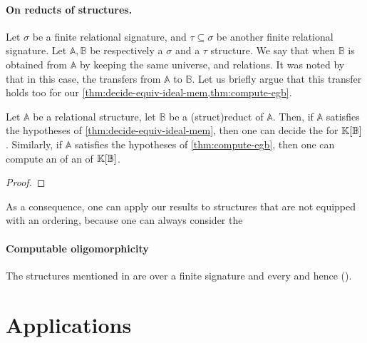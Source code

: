 \paragraph{On reducts of structures.} \AP Let $\sigma$ be a finite relational
signature, and $\tau \subseteq \sigma$ be another finite relational signature.
Let $\mathbb{A}, \mathbb{B}$ be respectively a $\sigma$ and a $\tau$ structure. We say
that  when $\mathbb{B}$ is
obtained from $\mathbb{A}$ by keeping the same universe, and relations. It was noted by \cite[Lemma 13]{GHOLAS24} that in
this case, the  transfers from
$\mathbb{A}$ to $\mathbb{B}$. Let us briefly argue that this transfer holds too
for our \cref{thm:decide-equiv-ideal-mem,thm:compute-egb}.


\begin{lemma}\label{lem:reducts-equiv-hilbert}
  Let $\mathbb{A}$ be a relational structure, let $\mathbb{B}$ be a 
  \kl(struct){reduct} of $\mathbb{A}$. Then, if $\mathbb{A}$ satisfies the
  hypotheses of \cref{thm:decide-equiv-ideal-mem},
  then one can decide the  for
  $\mathbb{K}[\mathbb{B}]$. Similarly, 
  if $\mathbb{A}$ satisfies the hypotheses of
  \cref{thm:compute-egb}, then one can compute an
   of an
   of $\mathbb{K}[\mathbb{B}]$.
\end{lemma}
\begin{proof}
\end{proof}

\AP 
As a consequence, one can apply our results to structures that are not equipped 
with an ordering, because one can always consider the 


\paragraph{Computable oligomorphicity}
%
The structures mentioned in  are  over a finite signature and every and hence  ().

%

\section{Applications}


